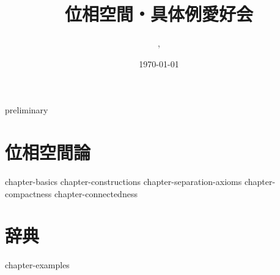 \documentclass[uplatex, dvipdfmx, a4paper, 12pt]{jsbook}
\begin{document}
\title{位相空間・具体例愛好会}
\author{\ykyki, \chen}
\date{\today}
\maketitle

\makeatletter
\makeatother

{preliminary}
\tableofcontents

\part{位相空間論}
\label{part:theories}
{chapter-basics}
{chapter-constructions}
{chapter-separation-axioms}
{chapter-compactness}
{chapter-connectedness}

\part{辞典}
\label{part:dictionary}
{chapter-examples}

\printindex

\printbibliography[title=参考文献]
\end{document}
